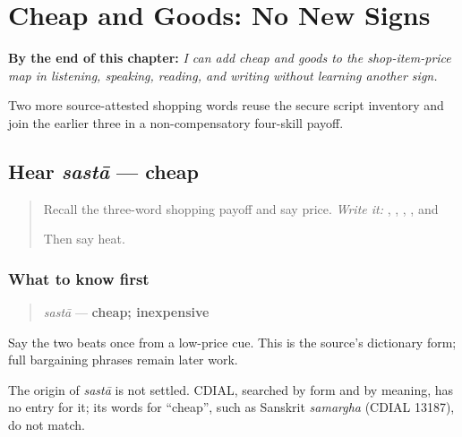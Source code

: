 
\chapter{Cheap and Goods: No New Signs}
\label{ch:mw-shopping-five}

\begin{chapteropening}
\textbf{By the end of this chapter:} \emph{I can add cheap and goods to the shop-item-price map in listening, speaking, reading, and writing without learning another sign.}

Two more source-attested shopping words reuse the secure script inventory and join the earlier three in a non-compensatory four-skill payoff.
\end{chapteropening}

\section[sastā]{Hear \emph{sastā} — cheap}

\label{lesson:MW-C14-hear-sasta}



\begin{quote}
Recall the three-word shopping payoff and say price. \emph{Write it:} \textbf{}, \textbf{}, \textbf{}, \textbf{}, and \textbf{}

Then say heat.
\end{quote}

\subsection*{What to know first}
\begin{quote}
\emph{sastā} — \textbf{cheap; inexpensive}
\end{quote}

Say the two beats once from a low-price cue. This is the source's dictionary form; full bargaining phrases remain later work.

\begin{cousinweb}
The origin of \emph{sastā} is not settled. CDIAL, searched by form and by meaning, has no entry for it; its words for \textquotedblleft{}cheap\textquotedblright{}, such as Sanskrit \emph{samargha} (CDIAL 13187), do not match.
\end{cousinweb}

